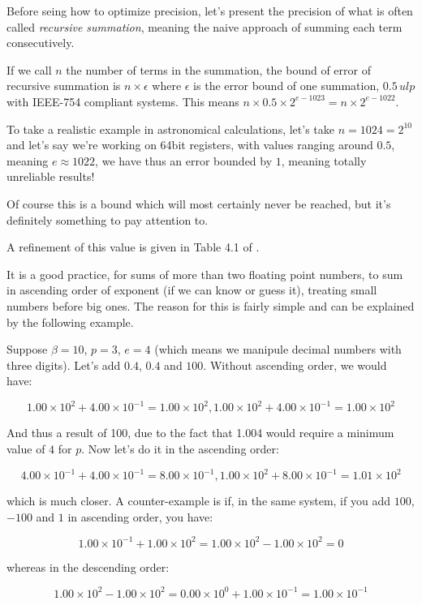 Before seing how to optimize precision, let's present the precision of what is often called \emph{recursive summation}, meaning the naive approach of summing each term consecutively.

If we call $n$ the number of terms in the summation, the bound of error of recursive summation is $n\times\epsilon$ where $\epsilon$ is the error bound of one summation, $0.5\,ulp$ with IEEE-754 compliant systems. This means $n\times0.5\times2^{e-1023} = n\times2^{e-1022}$.

To take a realistic example in astronomical calculations, let's take $n=1024=2^{10}$ and let's say we're working on 64bit registers, with values ranging around $0.5$, meaning $e\approx1022$, we have thus an error bounded by $1$, meaning totally unreliable results!

Of course this is a bound which will most certainly never be reached, but it's definitely something to pay attention to.

A refinement of this value is given in Table 4.1 of  \cite{Higham}.


It is a good practice, for sums of more than two floating point numbers, to sum in ascending order of exponent (if we can know or guess it), treating small numbers before big ones. The reason for this is fairly simple and can be explained by the following example.

Suppose $\beta=10$, $p=3$, $e=4$ (which means we manipule decimal numbers with three digits). Let's add $0.4$, $0.4$ and $100$. Without ascending order, we would have:

$$1.00\times 10^2 + 4.00\times 10^{-1} = 1.00\times 10^2, 1.00\times 10^2 + 4.00\times 10^{-1} = 1.00\times 10^2$$

And thus a result of 100, due to the fact that 1.004 would require a minimum value of $4$ for $p$. Now let's do it in the ascending order:

$$4.00\times 10^{-1} + 4.00\times 10^{-1} = 8.00\times 10^{-1}, 1.00\times 10^2 + 8.00 \times 10^{-1} = 1.01\times 10^2$$

which is much closer. A counter-example is if, in the same system, if you add $100$, $-100$ and $1$ in ascending order, you have:

$$1.00\times 10^{-1} + 1.00\times 10^{2} = 1.00\times 10^{2} - 1.00\times 10^{2} = 0$$

whereas in the descending order:

$$1.00\times 10^{2} - 1.00\times 10^{2} = 0.00\times 10^{0} + 1.00\times 10^{-1} = 1.00\times 10^{-1}$$

